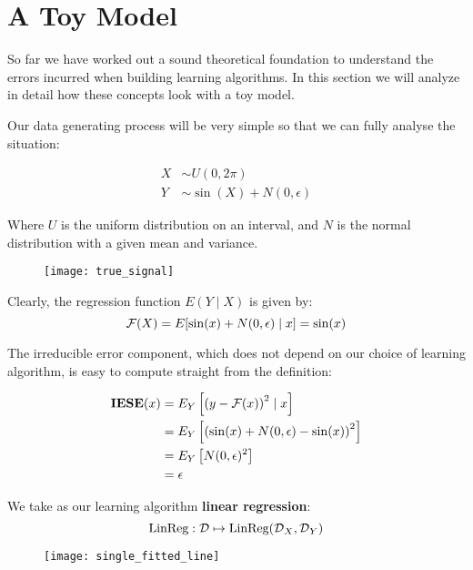 \section{A Toy Model}
%
%
\begin{frame}
  So far we have worked out a sound theoretical foundation to understand the
  errors incurred when building learning algorithms.  In this section we will
  analyze in detail how these concepts look with a toy model.
\end{frame}
%
%
\begin{frame}
  Our data generating process will be very simple so that we can fully analyse
  the situation:

  \begin{align*}
    X &\sim U(0, 2 \pi) \\
    Y &\sim \sin(X) + N(0, \epsilon)
  \end{align*}

  Where $U$ is the uniform distribution on an interval, and $N$ is the normal
  distribution with a given mean and variance.
\end{frame}
%
%
\begin{frame}
  \begin{figure}
    \texttt{[image: true\_signal]}
  \end{figure}

  Clearly, the regression function $E(Y \mid X)$ is given by:
  $$ \operatorname*{\mathcal{F}}(X) = E[ \sin(x) + N(0, \epsilon) \mid x ] = \sin(x) $$
\end{frame}
%
%
\begin{frame}
  The irreducible error component, which does not depend on our choice of
  learning algorithm, is easy to compute straight from the definition:

  \begin{align*}
      \operatorname*{\mathbf{IESE}}(x) &= E_Y \left[ \left( y - \operatorname*{\mathcal{F}}(x) \right)^2 \mid x \right] \\
      &= E_Y \left[ \left( \sin(x) + N(0, \epsilon) - \sin(x) \right)^2 \right] \\
      &= E_Y \left[ N(0, \epsilon)^2 \right] \\
      &= \epsilon
  \end{align*}
   
\end{frame}
%
%
\begin{frame}
  We take as our learning algorithm \textbf{linear regression}:
  $$ \operatorname*{\text{LinReg}}: \operatorname*{\mathcal{D}} \mapsto \operatorname*{\text{LinReg}}({\operatorname*{\mathcal{D}}}_{X}, {\operatorname*{\mathcal{D}}}_{Y}) $$
  \begin{figure}
    \texttt{[image: single\_fitted\_line]}
  \end{figure}
\end{frame}
